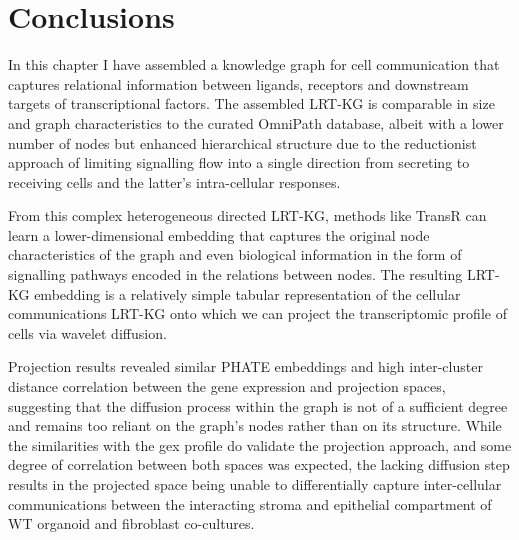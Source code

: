 \newpage
\section{Conclusions}



In this chapter I have assembled a knowledge graph for cell communication that captures relational information between ligands, receptors and downstream targets of transcriptional factors. The assembled LRT-KG is comparable in size and graph characteristics to the curated OmniPath database, albeit with a lower number of nodes but enhanced hierarchical structure due to the reductionist approach of limiting signalling flow into a single direction from secreting to receiving cells and the latter's intra-cellular responses. 

From this complex heterogeneous directed LRT-KG, methods like TransR can learn a lower-dimensional embedding that captures the original node characteristics of the graph and even biological information in the form of signalling pathways encoded in the relations between nodes. 
The resulting LRT-KG embedding is a relatively simple tabular representation of the cellular communications LRT-KG onto which we can project the transcriptomic profile of cells via wavelet diffusion.

Projection results revealed similar PHATE embeddings and high inter-cluster distance correlation between the gene expression and projection spaces, suggesting that the diffusion process within the graph is not of a sufficient degree and remains too reliant on the graph's nodes rather than on its structure. 
While the similarities with the \acrshort{gex} profile do validate the projection approach, and some degree of correlation between both spaces was expected, the lacking diffusion step results in the projected space being unable to differentially capture inter-cellular communications between the interacting stroma and epithelial compartment of WT organoid and fibroblast co-cultures.



